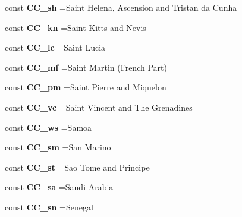 \begin{DoxyCompactItemize}
const {\bfseries C\+C\+\_\+sh} =\textquotesingle{}Saint Helena, Ascension and Tristan da Cunha\textquotesingle{}
\item 
\hypertarget{class_i_s_o_ab1b0cf65652fdcd2c8fa876c1f41edc7}{}\label{class_i_s_o_ab1b0cf65652fdcd2c8fa876c1f41edc7} 
const {\bfseries C\+C\+\_\+kn} =\textquotesingle{}Saint Kitts and Nevis\textquotesingle{}
\item 
\hypertarget{class_i_s_o_a94e743685a58b4e1f1e56e5c417dfdea}{}\label{class_i_s_o_a94e743685a58b4e1f1e56e5c417dfdea} 
const {\bfseries C\+C\+\_\+lc} =\textquotesingle{}Saint Lucia\textquotesingle{}
\item 
\hypertarget{class_i_s_o_ae0f7626aa8c7fb77ae659eeed21a1510}{}\label{class_i_s_o_ae0f7626aa8c7fb77ae659eeed21a1510} 
const {\bfseries C\+C\+\_\+mf} =\textquotesingle{}Saint Martin (French Part)\textquotesingle{}
\item 
\hypertarget{class_i_s_o_a9853790f22db61adfd30022cf5d398e2}{}\label{class_i_s_o_a9853790f22db61adfd30022cf5d398e2} 
const {\bfseries C\+C\+\_\+pm} =\textquotesingle{}Saint Pierre and Miquelon\textquotesingle{}
\item 
\hypertarget{class_i_s_o_aa5b75df33cd7e72e79e58491bb50c911}{}\label{class_i_s_o_aa5b75df33cd7e72e79e58491bb50c911} 
const {\bfseries C\+C\+\_\+vc} =\textquotesingle{}Saint Vincent and The Grenadines\textquotesingle{}
\item 
\hypertarget{class_i_s_o_a17ed5391650256549215888eaed625d3}{}\label{class_i_s_o_a17ed5391650256549215888eaed625d3} 
const {\bfseries C\+C\+\_\+ws} =\textquotesingle{}Samoa\textquotesingle{}
\item 
\hypertarget{class_i_s_o_ab3add42f106f820a8defede6b0e99603}{}\label{class_i_s_o_ab3add42f106f820a8defede6b0e99603} 
const {\bfseries C\+C\+\_\+sm} =\textquotesingle{}San Marino\textquotesingle{}
\item 
\hypertarget{class_i_s_o_a1e16fc111ef55af8217d2d2a5d7c3b92}{}\label{class_i_s_o_a1e16fc111ef55af8217d2d2a5d7c3b92} 
const {\bfseries C\+C\+\_\+st} =\textquotesingle{}Sao Tome and Principe\textquotesingle{}
\item 
\hypertarget{class_i_s_o_a0ff14124d3179cfe835b7a3f1b5a66fa}{}\label{class_i_s_o_a0ff14124d3179cfe835b7a3f1b5a66fa} 
const {\bfseries C\+C\+\_\+sa} =\textquotesingle{}Saudi Arabia\textquotesingle{}
\item 
\hypertarget{class_i_s_o_afeb4ec297da7817698387ec1133b9629}{}\label{class_i_s_o_afeb4ec297da7817698387ec1133b9629} 
const {\bfseries C\+C\+\_\+sn} =\textquotesingle{}Senegal\textquotesingle{}

\end{DoxyCompactItemize}
